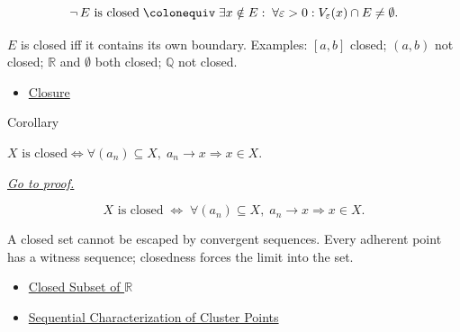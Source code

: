 \begin{remark*}
\[
  \neg\,E\text{ is closed}
  \;\colonequiv\;
  \exists x \notin E :\;
  \forall\varepsilon>0 : V_\varepsilon(x)\cap E\neq\emptyset.
\]
\end{remark*}

\begin{remark*}[Interpretation]
$E$ is closed iff it contains its own boundary. Examples:
$[a,b]$ closed; $(a,b)$ not closed; $\mathbb{R}$ and $\emptyset$
both closed; $\mathbb{Q}$ not closed.
\end{remark*}

\begin{dependencies}
\begin{itemize}
  \item \hyperref[def:closure-r]{Closure}
\end{itemize}
\end{dependencies}


\begin{corollarybox}{Corollary}
\begin{corollary}
\label{cor:closed-iff-seq-limits}
$X\text{ is closed} \iff \forall (a_n)\subseteq X,\;
a_n \to x \Rightarrow x \in X$.

\smallskip\noindent
\hyperref[prf:closed-iff-seq-limits]{\textit{Go to proof.}}
\end{corollary}
\end{corollarybox}

\begin{remark*}
\[
  X\text{ is closed}
  \;\iff\;
  \forall (a_n)\subseteq X,\;
  a_n\to x
  \Rightarrow x \in X.
\]
\end{remark*}

\begin{remark*}[Interpretation]
A closed set cannot be escaped by convergent sequences. Every adherent
point has a witness sequence; closedness forces the limit into the set.
\end{remark*}

\begin{dependencies}
\begin{itemize}
  \item \hyperref[def:closed-set-r]{Closed Subset of $\mathbb{R}$}
  \item \hyperref[thm:cluster-point-sequential]{Sequential Characterization of Cluster Points}
\end{itemize}
\end{dependencies}

